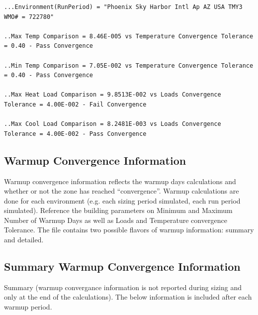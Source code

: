 \begin{lstlisting}
...Environment(RunPeriod) = "Phoenix Sky Harbor Intl Ap AZ USA TMY3 WMO# = 722780"

..Max Temp Comparison = 8.46E-005 vs Temperature Convergence Tolerance = 0.40 - Pass Convergence

..Min Temp Comparison = 7.05E-002 vs Temperature Convergence Tolerance = 0.40 - Pass Convergence

..Max Heat Load Comparison = 9.8513E-002 vs Loads Convergence Tolerance = 4.00E-002 - Fail Convergence

..Max Cool Load Comparison = 8.2481E-003 vs Loads Convergence Tolerance = 4.00E-002 - Pass Convergence
\end{lstlisting}

\subsection{Warmup Convergence Information}

Warmup convergence information reflects the warmup days calculations and whether or not the zone has reached “convergence”. Warmup calculations are done for each environment (e.g. each sizing period simulated, each run period simulated). Reference the building parameters on Minimum and Maximum Number of Warmup Days as well as Loads and Temperature convergence Tolerance. The file contains two possible flavors of warmup information: summary and detailed.

\subsection{Summary Warmup Convergence Information}

Summary (warmup convergance information is not reported during sizing and only at the end of the calculations). The below information is included after each warmup period.


